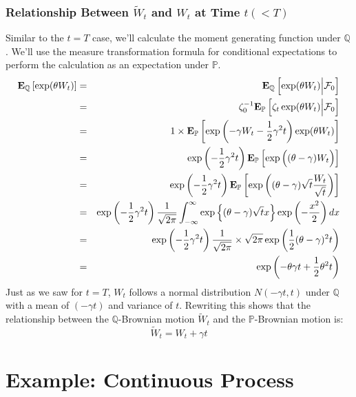 \documentclass[uplatex,a4j,12pt,dvipdfmx]{jsarticle}
\begin{document}
\subsubsection{Relationship Between $\tilde{W}_{t}$ and $W_{t}$ at Time $t(<T)$}

Similar to the $t=T$ case, we'll calculate the moment generating function under $\mathbb{Q}$. We'll use the measure transformation formula for conditional expectations to perform the calculation as an expectation under $\mathbb{P}$.
%
\begin{eqnarray*}
	{\bf E}_{\mathbb{Q}}
	\left[ \exp ( \theta W_{t} ) \right]
	&=&
	{\bf E}_{\mathbb{Q}}
	\left[ \exp ( \theta W_{t} ) \Big| \mathcal{F}_{0} \right]
	\\ &=&
	\zeta_{0}^{-1}
	{\bf E}_{\mathbb{P}}
	\left[ \zeta_{t} \exp ( \theta W_{t} ) \Big| \mathcal{F}_{0} \right]
	\\ &=&
	1 \times
	{\bf E}_{\mathbb{P}}
	\left[ \exp \left( - \gamma W_{t} - \dfrac{1}{2} \gamma^{2} t \right) \exp ( \theta W_{t} ) \right]
	\\ &=&
	\exp \left( - \dfrac{1}{2} \gamma^{2} t \right)
	{\bf E}_{\mathbb{P}}
	\left[ \exp \Big( ( \theta - \gamma ) W_{t} \Big) \right]
	\\ &=&
	\exp \left( - \dfrac{1}{2} \gamma^{2} t \right)
	{\bf E}_{\mathbb{P}}
	\left[ \exp \left( ( \theta - \gamma ) \sqrt{t} \dfrac{ W_{t} }{ \sqrt{t} } \right) \right]
	\\ &=&
	\exp \left( - \dfrac{1}{2} \gamma^{2} t \right)
	\dfrac{1}{\sqrt{2 \pi}}
	\int^{\infty}_{-\infty}
	\exp \left\{ ( \theta - \gamma ) \sqrt{t} x \right\} \exp \left( -\dfrac{x^{2}}{2} \right) dx
	\\ &=&
	\exp \left( - \dfrac{1}{2} \gamma^{2} t \right)
	\dfrac{1}{\sqrt{2 \pi}}
	\times \sqrt{ 2 \pi }
	\exp \left( \dfrac{1}{2} (\theta - \gamma)^{2} t \right)
	\\ &=&
	\exp \left( - \theta \gamma t + \dfrac{1}{2} \theta^{2} t \right)
\end{eqnarray*}
%
Just as we saw for $t=T$, $W_{t}$ follows a normal distribution $N(- \gamma t, t)$ under $\mathbb{Q}$ with a mean of $(- \gamma t)$ and variance of $t$.
Rewriting this shows that the relationship between the $\mathbb{Q}$-Brownian motion $\tilde{W}_{t}$ and the $\mathbb{P}$-Brownian motion is:
$$
	\tilde{W}_{t} = W_{t} + \gamma t
$$

\section{Example: Continuous Process}
\end{document}
